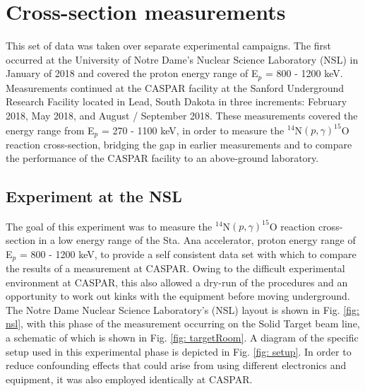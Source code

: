 \section{Cross-section measurements}
\label{sec: cs experiment}

This set of data was taken over separate experimental campaigns. The first occurred at the University of Notre Dame's Nuclear Science Laboratory (NSL) in January of 2018 and covered the proton energy range of E$_{p}$ = 800 - 1200 keV. Measurements continued at the CASPAR facility at the Sanford Underground Research Facility located in Lead, South Dakota in three increments: February 2018, May 2018, and August / September 2018. These measurements covered the energy range from E$_{p}$ = 270 - 1100 keV, in order to measure the $^{14}$N$\left( p,\gamma \right) ^{15}$O reaction cross-section, bridging the gap in earlier measurements and to compare the performance of the CASPAR facility to an above-ground laboratory.


\subsection{Experiment at the NSL}
\label{sec: expND}

The goal of this experiment was to measure the $^{14}$N$\left( p,\gamma \right) ^{15}$O reaction cross-section in a low energy range of the Sta. Ana accelerator, proton energy range of E$_{p}$ = 800 - 1200 keV, to provide a self consistent data set with which to compare the results of a measurement at CASPAR. Owing to the difficult experimental environment at CASPAR, this also allowed a dry-run of the procedures and an opportunity to work out kinks with the equipment before moving underground. The Notre Dame Nuclear Science Laboratory's (NSL) layout is shown in Fig. \ref{fig: nsl}, with this phase of the measurement occurring on the Solid Target beam line, a schematic of which is shown in Fig. \ref{fig: targetRoom}. A diagram of the specific setup used in this experimental phase is depicted in Fig. \ref{fig: setup}. In order to reduce confounding effects that could arise from using different electronics and equipment, it was also employed identically at CASPAR. 


